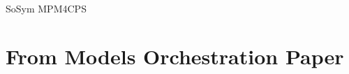 \begin{copiedFrom}{SoSym MPM4CPS}

\end{copiedFrom} %


\section*{From Models Orchestration Paper}


